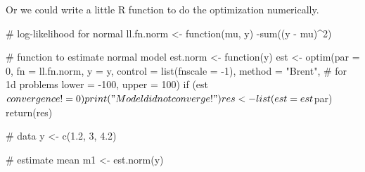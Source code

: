 \documentclass{beamer}
\begin{document}


\begin{frame}[fragile]
Or we could write a little R function to do the optimization numerically.
\begin{scriptsize}
\pause \begin{blockcode} 
# log-likelihood for normal
ll.fn.norm <- function(mu, y) {
  -sum((y - mu)^2)
}
\end{blockcode}

\pause \begin{blockcode}
# function to estimate normal model
est.norm <- function(y) {
  est <- optim(par = 0, fn = ll.fn.norm, y = y,
               control = list(fnscale = -1),
               method = "Brent",  # for 1d problems
               lower = -100, upper = 100)
  if (est$convergence != 0) print("Model did not converge!")
  res <- list(est = est$par)
  return(res)
}
\end{blockcode}

\pause \begin{blockcode}
# data
y <- c(1.2, 3, 4.2)
\end{blockcode}

\pause \begin{blockcode}
# estimate mean
m1 <- est.norm(y)
\end{blockcode}
\end{scriptsize}
\end{frame}
\end{document}
